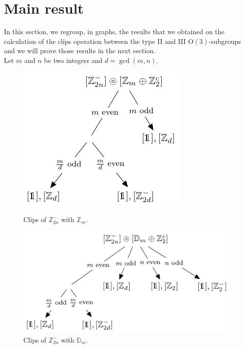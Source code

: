 \documentclass[11pt,a4paper]{amsart}
\theoremstyle{definition}
\newcommand{\ZZ}{\mathbb{Z}}                %
\newcommand{\OO}{\mathrm{O}}                %
\newcommand{\DD}{\mathbb{D}}                %
\newcommand{\1}{\mathds{1}}		            %
\begin{document}
\section{Main result}
In this section, we regroup, in graphs, the results that we obtained on the calculation of the clips operation between the type II and III $\OO(3)$-subgroups and we will prove those results in the next section.
\\ Let $m$ and $n$ be two integers and $d=\gcd(m,n)$.
\begin{figure}[h!]
	\begin{minipage}[b]{0.5\linewidth}
		\centering \includegraphics[width=0.6\linewidth]{"Figures piezo/graphe1"}
		\caption{Clips of $\ZZ_{2n}^-$ with $\ZZ_m$.}
		\label{fig:graphe1}
	\end{minipage}\hfill
	\begin{minipage}[b]{0.5\linewidth}
		\centering \includegraphics[width=0.9\linewidth]{"Figures piezo/graphe2"}
		\caption{Clips of $\ZZ_{2n}^-$ with $\DD_m$.}
		\label{fig:graphe2}
	\end{minipage}
\end{figure}
\end{document}
